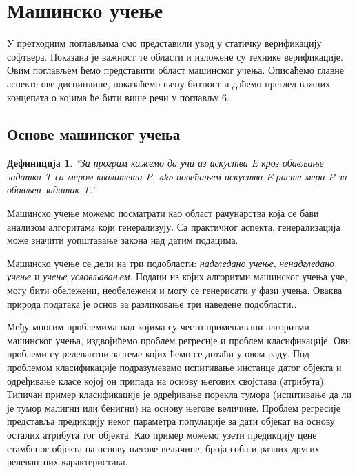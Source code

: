 \documentclass[a4paper]{article}
\newtheorem{definic}{Дефиниција}
\begin{document}
{\section{Машинско учење}
У претходним поглављима смо представили увод у статичку верификацију софтвера. Показана је важност те области и изложене су технике верификације. Овим поглављем ћемо представити област машинског учења. Описаћемо главне аспекте ове дисциплине, показаћемо њену битност и даћемо преглед важних концепата о којима ће бити више речи у поглављу 6.

\subsection{Основе машинског учења}
\begin{definic}
``За програм кажемо да учи из искуства E кроз обављање задатка T са мером квалитета P, ako повећањем искуства E расте мера P за обављен задатак T.''
\\[5pt]
\end{definic}


Машинско учење можемо посматрати као област рачунарства која се бави анализом алгоритама који генерализују. Са практичног аспекта, генерализација може значити уопштавање закона над датим подацима.


Машинско учење се дели на три подобласти: \textit{надгледано учење}, \textit{ненадгледано учење} и \textit{учење условљавањем}. Подаци из којих алгоритми машинског учења уче, могу бити обележени, необележени и могу се генерисати у фази учења. Оваква природа података је основ за разликовање три наведене подобласти.\cite{tom-ml}.


Међу многим проблемима над којима су често примењивани алгоритми машинског учења, издвојићемо проблем регресије и проблем класификације. Ови проблеми су релевантни за теме којих ћемо се дотаћи у овом раду. Под проблемом класификације подразумевамо испитивање инстанце датог објекта и одређивање класе којој он припада на основу његових својстава (атрибута). Типичан пример класификације је одређивање порекла тумора (испитивање да ли је тумор малигни или бенигни) на основу његове величине. Проблем регресије представља предикцију неког параметра популације за дати објекат на основу осталих атрибута тог објекта. Као пример можемо узети предикцију цене стамбеног објекта на основу његове величине, броја соба и разних других релевантних карактеристика.


}
\end{document}
